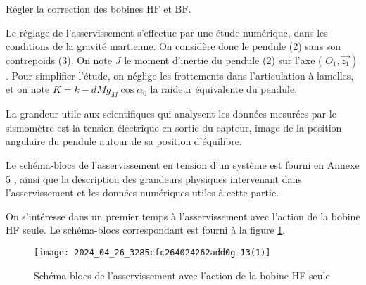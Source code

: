 \begin{obj}
Régler la correction des bobines $\mathrm{HF}$ et $\mathrm{BF}$.
\end{obj}

Le réglage de l'asservissement s'effectue par une étude numérique, dans les conditions de la gravité martienne. On considère donc le pendule (2) sans son contrepoids (3). On note $J$ le moment d'inertie du pendule (2) sur l'axe ( $\left.O_{1}, \overrightarrow{z_{1}}\right)$. Pour simplifier l'étude, on néglige les frottements dans l'articulation à lamelles, et on note $K=k-d M g_{M} \cos \alpha_{0}$ la raideur équivalente du pendule.

La grandeur utile aux scientifiques qui analysent les données mesurées par le sismomètre est la tension électrique en sortie du capteur, image de la position angulaire du pendule autour de sa position d'équilibre.

Le schéma-blocs de l'asservissement en tension d'un système est fourni en Annexe 5 , ainsi que la description des grandeurs physiques intervenant dans l'asservissement et les données numériques utiles à cette partie.

On s'intéresse dans un premier temps à l'asservissement avec l'action de la bobine HF seule. Le schéma-blocs correspondant est fourni à la figure \ref{ccmp2023_fig_11}.

\begin{figure}[!h]
\centering
\texttt{[image: 2024\_04\_26\_3285cfc264024262add0g-13(1)]}
\caption{\label{ccmp2023_fig_11} Schéma-blocs de l'asservissement avec l'action de la bobine HF seule}
\end{figure}
\fi


